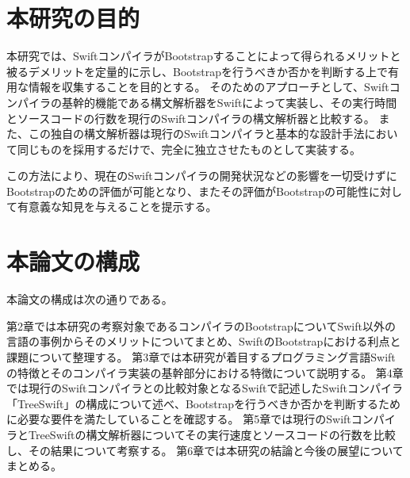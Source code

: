 \section{本研究の目的}
\label{introduction:purpose}

本研究では、SwiftコンパイラがBootstrapすることによって得られるメリットと被るデメリットを定量的に示し、Bootstrapを行うべきか否かを判断する上で有用な情報を収集することを目的とする。
そのためのアプローチとして、Swiftコンパイラの基幹的機能である構文解析器をSwiftによって実装し、その実行時間とソースコードの行数を現行のSwiftコンパイラの構文解析器と比較する。
また、この独自の構文解析器は現行のSwiftコンパイラと基本的な設計手法において同じものを採用するだけで、完全に独立させたものとして実装する。

この方法により、現在のSwiftコンパイラの開発状況などの影響を一切受けずにBootstrapのための評価が可能となり、またその評価がBootstrapの可能性に対して有意義な知見を与えることを提示する。


\section{本論文の構成}

本論文の構成は次の通りである。

第2章では本研究の考察対象であるコンパイラのBootstrapについてSwift以外の言語の事例からそのメリットについてまとめ、SwiftのBootstrapにおける利点と課題について整理する。
第3章では本研究が着目するプログラミング言語Swiftの特徴とそのコンパイラ実装の基幹部分における特徴について説明する。
第4章では現行のSwiftコンパイラとの比較対象となるSwiftで記述したSwiftコンパイラ「TreeSwift」の構成について述べ、Bootstrapを行うべきか否かを判断するために必要な要件を満たしていることを確認する。
第5章では現行のSwiftコンパイラとTreeSwiftの構文解析器についてその実行速度とソースコードの行数を比較し、その結果について考察する。
第6章では本研究の結論と今後の展望についてまとめる。

